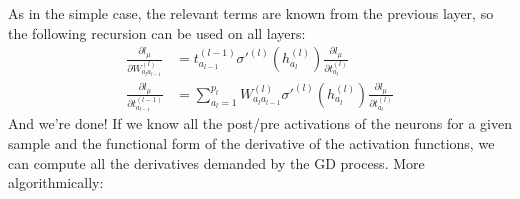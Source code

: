 \documentclass{article}
\begin{document}
As in the simple case, the relevant terms are known from the previous layer, so the following recursion can be used on all layers:
\begin{align}
    \frac{\partial l_{\mu}}{\partial W^{(l)}_{a_{l} a_{l-1}}}
    &=
    t^{(l-1)}_{a_{l-1}} \sigma'^{(l)} (h^{(l)}_{a_{l}})
    \frac{\partial l_{\mu}}{\partial t^{(l)}_{a_{l}}}
     \\
    \frac{\partial l_{\mu}}{\partial t^{(l-1)}_{a_{l-1}}}
    &=
    \sum_{a_{l}=1}^{p_{l}}
    W^{(l)}_{a_{l}a_{l-1}}
    \sigma'^{(l)} (h^{(l)}_{a_{l}})
    \frac{\partial l_{\mu}}{\partial t^{(l)}_{a_{l}}}
\end{align}
And we're done! If we know all the post/pre activations of the neurons for a given sample and the functional form of the derivative of the activation functions, we can compute all the derivatives demanded by the GD process. More algorithmically:
\end{document}
